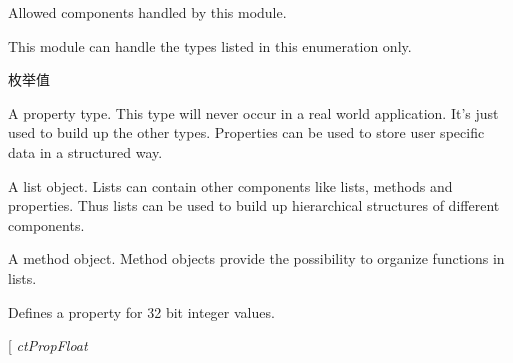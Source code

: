 Allowed components handled by this module. 

This module can handle the types listed in this enumeration only. \begin{Desc}
\item[枚举值]\par
\begin{description}
\item[{\em 
\hypertarget{group___common_interface_gga7dbe9709a3bdae0b29581ff4f6fca3ffa8d3ee56eff47a71c61b0a11eff7e25bc}{ct\+Prop}\label{group___common_interface_gga7dbe9709a3bdae0b29581ff4f6fca3ffa8d3ee56eff47a71c61b0a11eff7e25bc}
}]A property type. This type will never occur in a real world application. It's just used to build up the other types. Properties can be used to store user specific data in a structured way. \item[{\em 
\hypertarget{group___common_interface_gga7dbe9709a3bdae0b29581ff4f6fca3ffae7bb2735a966bff3440c5285bc67f6cf}{ct\+List}\label{group___common_interface_gga7dbe9709a3bdae0b29581ff4f6fca3ffae7bb2735a966bff3440c5285bc67f6cf}
}]A list object. Lists can contain other components like lists, methods and properties. Thus lists can be used to build up hierarchical structures of different components. \item[{\em 
\hypertarget{group___common_interface_gga7dbe9709a3bdae0b29581ff4f6fca3ffad285dbaa2103bc6c6a8a7b6f5796bc98}{ct\+Meth}\label{group___common_interface_gga7dbe9709a3bdae0b29581ff4f6fca3ffad285dbaa2103bc6c6a8a7b6f5796bc98}
}]A method object. Method objects provide the possibility to organize functions in lists. \item[{\em 
\hypertarget{group___common_interface_gga7dbe9709a3bdae0b29581ff4f6fca3ffabfcc47c45ea89c0c9539330d92a322b2}{ct\+Prop\+Int}\label{group___common_interface_gga7dbe9709a3bdae0b29581ff4f6fca3ffabfcc47c45ea89c0c9539330d92a322b2}
}]Defines a property for 32 bit integer values. \item[{\em 
\hypertarget{group___common_interface_gga7dbe9709a3bdae0b29581ff4f6fca3ffa72f85f818b417606abd5631096b1031a}{ct\+Prop\+Float}\label{group___common_interface_gga7dbe9709a3bdae0b29581ff4f6fca3ffa72f85f818b417606abd5631096b1031a}
}
\end{description}
\end{Desc}
